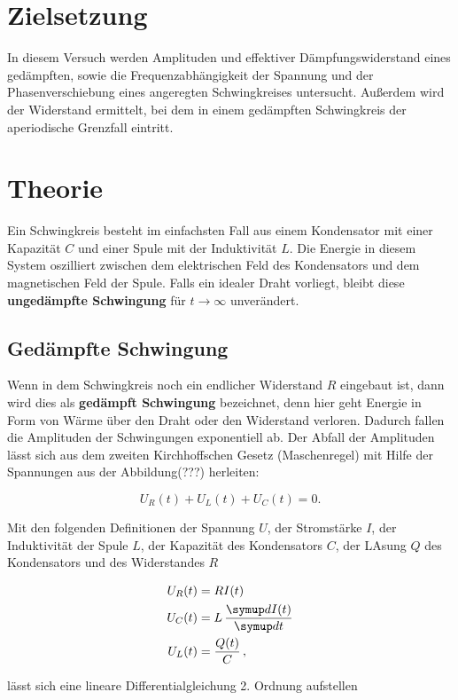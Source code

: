 \section{Zielsetzung}
In diesem Versuch werden Amplituden und effektiver Dämpfungswiderstand eines gedämpften, sowie
die Frequenzabhängigkeit der Spannung und der Phasenverschiebung eines angeregten Schwingkreises
untersucht. Außerdem wird der Widerstand ermittelt, bei dem in einem gedämpften Schwingkreis der
aperiodische Grenzfall eintritt.

\section{Theorie}
Ein Schwingkreis besteht im einfachsten Fall aus einem Kondensator mit einer Kapazität $C$ und einer Spule mit der Induktivität $L$.
Die Energie in diesem System oszilliert zwischen dem elektrischen Feld des Kondensators und dem magnetischen Feld der Spule.
Falls ein idealer Draht vorliegt, bleibt diese \textbf{ungedämpfte Schwingung} für $ t \to \infty $ unverändert.

\subsection{Gedämpfte Schwingung}
Wenn  in dem Schwingkreis noch ein endlicher Widerstand $R$ eingebaut ist, dann wird dies als \textbf{gedämpft Schwingung}
bezeichnet, denn hier geht Energie in Form von Wärme über den Draht oder den Widerstand verloren. Dadurch fallen die Amplituden
der Schwingungen exponentiell ab.
Der Abfall der Amplituden lässt sich aus dem zweiten Kirchhoffschen Gesetz (Maschenregel) mit Hilfe der Spannungen aus der Abbildung(???)
herleiten:

\begin{equation*}
  U_R(t) + U_L(t) + U_C(t) = 0.
\end{equation*}

Mit den folgenden Definitionen der Spannung $U$, der Stromstärke $I$, der Induktivität der Spule $L$,
der Kapazität des Kondensators $C$, der LAsung $Q$ des Kondensators und des Widerstandes $R$

\begin{align*}
  U_R(t) &= R I(t) \\
  U_C(t) &= L \, \frac{\symup d I(t)}{\symup d t} \\
  U_L(t) &= \frac{Q(t)}{C} \, ,
\end{align*}

lässt sich eine lineare Differentialgleichung 2. Ordnung aufstellen

